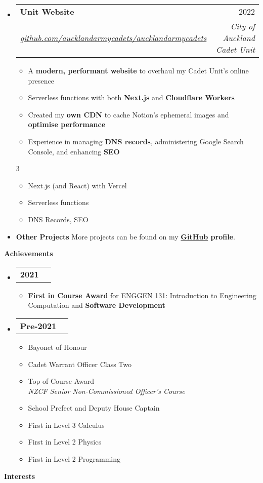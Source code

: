 \documentclass[11pt,a4paper]{article}[leftmargin=*]
\makeatletter
\def \entryspacing {-0pt}
\renewcommand{\section}[2]{\vspace{5pt}
  \colorbox{secondary}{\color{white}\raggedbottom\normalsize\textbf{{#1}{\hspace{7pt}#2}}}
}
\newcommand{\resumeEntryStart}{\begin{itemize}[leftmargin=2.5mm]}
\newcommand{\resumeEntryEnd}{\end{itemize}\vspace{\entryspacing}}
\newcommand{\resumeItemListStart}{\begin{itemize}[leftmargin=4.5mm]}
\newcommand{\resumeItemListEnd}{\end{itemize}}
\newcommand{\resumeItemListStartColumns}[2][-0.5]{\vspace*{#1\multicolsep}
\begin{multicols}{#2}\begin{itemize}[leftmargin=4.5mm]}
\newcommand{\resumeItemListEndColumns}[1][-0.5]{\end{itemize}\end{multicols}\vspace*{#1\multicolsep}}
\newcommand{\resumeItem}[1]{
  \item\small{
    {#1 \vspace{-2pt}}
  }
}
\newcommand{\resumeEntryTSDL}[4]{
  \vspace{-1pt}\item[]
    \begin{tabularx}{0.97\textwidth}{X@{\hspace{60pt}}r}
      \textbf{\color{primary}#1} & {\firabook\color{accent}\small#2} \\
      \textit{\color{accent}\small#3} & \textit{\color{accent}\small#4} \\
    \end{tabularx}\vspace{-6pt}
}
\newcommand{\resumeEntryTD}[2]{
  \vspace{-1pt}\item[]
    \begin{tabularx}{0.97\textwidth}{X@{\hspace{60pt}}r}
      \textbf{\color{primary}#1} & {\firabook\color{accent}\small#2} \\
    \end{tabularx}\vspace{-6pt}
}
\newcommand{\resumeEntryS}[2]{
  \item[]\small{
    \textbf{\color{primary}#1 }{ #2 \vspace{-4pt}}
  }
}
\newcommand{\resumeIt}[1]{\textit{\color{accent}#1}}
\newcommand{\resumeBf}[1]{\small\textbf{\color{halfbold}#1}}
\makeatother
\begin{document}
\resumeEntryStart
\resumeEntryTSDL
{Unit Website}{2022}
{\href{https://github.com/aucklandarmycadets/aucklandarmycadets}{github.com/aucklandarmycadets/aucklandarmycadets}}{City of Auckland Cadet Unit}
\resumeItemListStart
\resumeItem {A \resumeBf{modern, performant website} to overhaul my Cadet Unit's online presence}
\resumeItem {Serverless functions with both \resumeBf{Next.js} and \resumeBf{Cloudflare Workers}}
\resumeItem {Created my \resumeBf{own CDN} to cache Notion's ephemeral images and \resumeBf{optimise performance}}
\resumeItem {Experience in managing \resumeBf{DNS records}, administering Google Search Console, and enhancing \resumeBf{SEO}}
\resumeItemListEnd
\resumeItemListStartColumns{3}
\resumeItem {Next.js (and React) with Vercel}
\resumeItem {Serverless functions}
\resumeItem {DNS Records, SEO}
\resumeItemListEndColumns
\resumeEntryEnd

\resumeEntryStart
\resumeEntryS
{Other Projects}{More projects can be found on my \resumeBf{\href{https://github.com/jamesnzl}{GitHub} profile}.}
\resumeEntryEnd


\section{\faTrophy}{Achievements}

\resumeEntryStart
\resumeEntryTD{2021}{}
\resumeItemListStart
\resumeItem {\resumeBf{First in Course Award} for ENGGEN 131: Introduction to Engineering Computation and \resumeBf{Software Development}}
\resumeItemListEnd
\resumeEntryEnd

\resumeEntryStart
\resumeEntryTD{Pre-2021}{}
\begin{multicols}{2}
  \resumeItemListStart
  \resumeItem {Bayonet of Honour}
  \resumeItem {Cadet Warrant Officer Class Two}
  \resumeItem {Top of Course Award\\\resumeIt{NZCF Senior Non-Commissioned Officer's Course}}
  \resumeItem {School Prefect and Deputy House Captain}
  \resumeItem {First in Level 3 Calculus}
  \resumeItem {First in Level 2 Physics}
  \resumeItem {First in Level 2 Programming}
  \resumeItemListEnd
\end{multicols}
\resumeEntryEnd


\section{\faUserCircle}{Interests}
\end{document}
